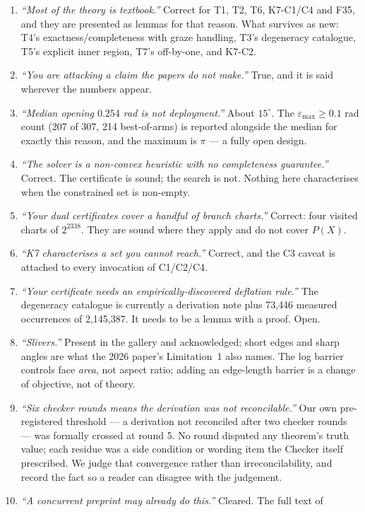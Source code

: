 \documentclass[11pt,a4paper]{article}
\theoremstyle{definition}
\begin{document}
\begin{enumerate}\itemsep3pt
\item \emph{``Most of the theory is textbook.''} Correct for T1, T2, T6, K7-C1/C4 and F35, and
they are presented as lemmas for that reason. What survives as new: T4's
exactness/completeness with graze handling, T3's degeneracy catalogue, T5's explicit inner
region, T7's off-by-one, and K7-C2.
\item \emph{``You are attacking a claim the papers do not make.''} True, and it is said
wherever the numbers appear.
\item \emph{``Median opening $0.254$ rad is not deployment.''} About $15^\circ$. The
$\varepsilon_{\max}\ge0.1$ rad count (207 of 307, 214 best-of-arms) is reported alongside the
median for exactly this reason, and the maximum is $\pi$ --- a fully open design.
\item \emph{``The solver is a non-convex heuristic with no completeness guarantee.''} Correct.
The certificate is sound; the search is not. Nothing here characterises when the constrained
set is non-empty.
\item \emph{``Your dual certificates cover a handful of branch charts.''} Correct: four
visited charts of $2^{2338}$. They are sound where they apply and do not cover $P(X)$.
\item \emph{``K7 characterises a set you cannot reach.''} Correct, and the C3 caveat is
attached to every invocation of C1/C2/C4.
\item \emph{``Your certificate needs an empirically-discovered deflation rule.''} The
degeneracy catalogue is currently a derivation note plus 73{,}446 measured occurrences of
2{,}145{,}387. It needs to be a lemma with a proof. Open.
\item \emph{``Slivers.''} Present in the gallery and acknowledged; short edges and sharp angles
are what the 2026 paper's Limitation~1 also names. The log barrier controls face \emph{area},
not aspect ratio; adding an edge-length barrier is a change of objective, not of theory.
\item \emph{``Six checker rounds means the derivation was not reconcilable.''} Our own
pre-registered threshold --- a derivation not reconciled after two checker rounds --- was
formally crossed at round 5. No round disputed any theorem's truth value; each residue was a
side condition or wording item the Checker itself prescribed. We judge that convergence rather
than irreconcilability, and record the fact so a reader can disagree with the judgement.
\item \emph{``A concurrent preprint may already do this.''} Cleared. The full text of

\end{enumerate}
\end{document}
